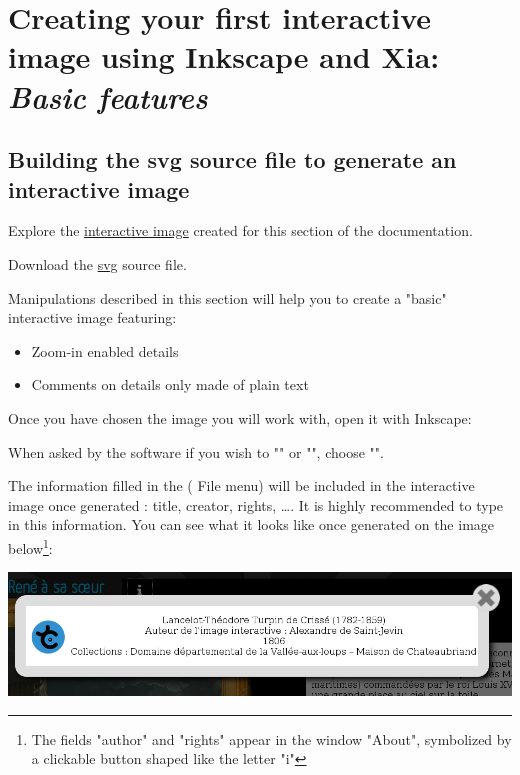 \section{Creating your first interactive image using Inkscape and Xia: \emph{Basic features}}\label{basic_imageactive}

\subsection{Building the svg source file to generate an interactive image}\label{preparation_svg}

\begin{links}
Explore the \href{http://xia.dane.ac-versailles.fr/demo/tuto/xia1}{interactive image} created for this section of the documentation.

Download the \href{http://xia.dane.ac-versailles.fr/demo/tuto/xia1/svg/xia1.svg}{svg} source file.
\end{links}

Manipulations described in this section will help you to
create a "basic" interactive image featuring:
\begin{itemize}
 \item Zoom-in enabled details
 \item Comments on details only made of plain text
\end{itemize}


Once you have chosen the image you will work with, open it with Inkscape:


When asked by the software if you wish to "" or "", choose "".

The information filled in the  (\softmenu
{File} menu) will be included in the interactive image once
generated : title, creator, rights, \ldots. It is highly recommended to type in this information.
You can see what it looks like once generated on the image below\footnote{The
fields "author" and "rights" appear in the window
"About", symbolized by a clickable button shaped like the letter "i"}:\\

\begin{center}
 \includegraphics[width=\textwidth]{images/ia_title}\\
\end{center}

